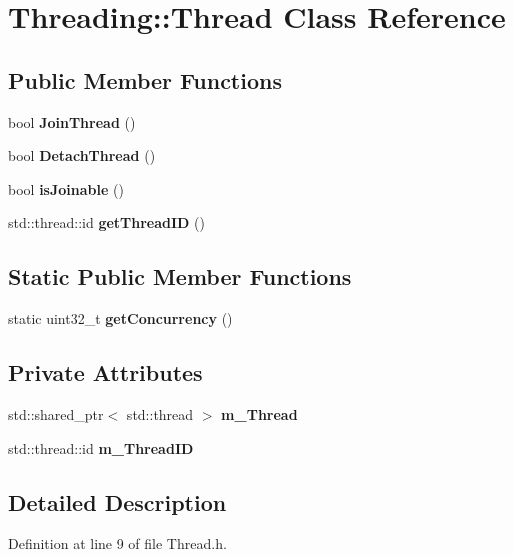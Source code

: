 \hypertarget{class_threading_1_1_thread}{}\section{Threading\+:\+:Thread Class Reference}
\label{class_threading_1_1_thread}
\subsection*{Public Member Functions}
\begin{DoxyCompactItemize}
\item 
bool {\bfseries Join\+Thread} ()\hypertarget{class_threading_1_1_thread_a0e5ea98156957cfec5c807231aabc559}{}\label{class_threading_1_1_thread_a0e5ea98156957cfec5c807231aabc559}

\item 
bool {\bfseries Detach\+Thread} ()\hypertarget{class_threading_1_1_thread_aa73d6a231d8a60edc489c780275041d5}{}\label{class_threading_1_1_thread_aa73d6a231d8a60edc489c780275041d5}

\item 
bool {\bfseries is\+Joinable} ()\hypertarget{class_threading_1_1_thread_a04efbf0a04a392557051184d3d5261b6}{}\label{class_threading_1_1_thread_a04efbf0a04a392557051184d3d5261b6}

\item 
std\+::thread\+::id {\bfseries get\+Thread\+ID} ()\hypertarget{class_threading_1_1_thread_a30d653a16e4474dfa4137e43ac6ef634}{}\label{class_threading_1_1_thread_a30d653a16e4474dfa4137e43ac6ef634}

\end{DoxyCompactItemize}
\subsection*{Static Public Member Functions}
\begin{DoxyCompactItemize}
\item 
static uint32\+\_\+t {\bfseries get\+Concurrency} ()\hypertarget{class_threading_1_1_thread_a0cdc1096669dd29fe56d3e21d1b13506}{}\label{class_threading_1_1_thread_a0cdc1096669dd29fe56d3e21d1b13506}

\end{DoxyCompactItemize}
\subsection*{Private Attributes}
\begin{DoxyCompactItemize}
\item 
std\+::shared\+\_\+ptr$<$ std\+::thread $>$ {\bfseries m\+\_\+\+Thread}\hypertarget{class_threading_1_1_thread_aa75179604a5656e9911746eaa2bf6321}{}\label{class_threading_1_1_thread_aa75179604a5656e9911746eaa2bf6321}

\item 
std\+::thread\+::id {\bfseries m\+\_\+\+Thread\+ID}\hypertarget{class_threading_1_1_thread_ae4aef2e20a2f1069caee8ec58c2a1b03}{}\label{class_threading_1_1_thread_ae4aef2e20a2f1069caee8ec58c2a1b03}

\end{DoxyCompactItemize}


\subsection{Detailed Description}


Definition at line 9 of file Thread.\+h.

